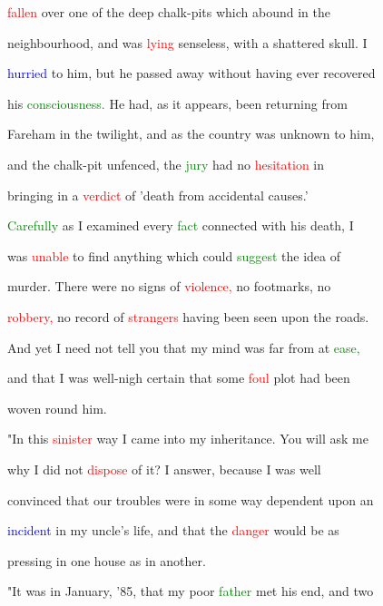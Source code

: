  \textcolor{red}{fallen} over one of the deep chalk-pits which abound in the

 neighbourhood, and was \textcolor{red}{lying} \textcolor{BurntOrange}{senseless,} with a \textcolor{BurntOrange}{shattered} skull. I

 \textcolor{blue}{hurried} to him, but he passed away without having ever recovered

 his \textcolor{green}{consciousness.} He had, as it appears, been returning from

 Fareham in the twilight, and as the country was \textcolor{BurntOrange}{unknown} to him,

 and the chalk-pit unfenced, the \textcolor{green}{jury} had no \textcolor{red}{hesitation} in

 bringing in a \textcolor{red}{verdict} of \textcolor{BurntOrange}{'death} from \textcolor{BurntOrange}{accidental} causes.'

 \textcolor{green}{Carefully} as I examined every \textcolor{green}{fact} connected with his \textcolor{BurntOrange}{death,} I

 was \textcolor{red}{unable} to find anything which could \textcolor{green}{suggest} the idea of

 \textcolor{BurntOrange}{murder.} There were no signs of \textcolor{red}{violence,} no footmarks, no

 \textcolor{red}{robbery,} no record of \textcolor{red}{strangers} having been seen upon the roads.

 And yet I need not tell you that my mind was far from at \textcolor{green}{ease,}

 and that I was well-nigh certain that some \textcolor{red}{foul} plot had been

 woven round him.



 "In this \textcolor{red}{sinister} way I came into my \textcolor{BurntOrange}{inheritance.} You will ask me

 why I did not \textcolor{red}{dispose} of it? I answer, because I was well

 \textcolor{BurntOrange}{convinced} that our troubles were in some way \textcolor{BurntOrange}{dependent} upon an

 \textcolor{blue}{incident} in my uncle's life, and that the \textcolor{red}{danger} would be as

 pressing in one house as in another.



 "It was in January, '85, that my poor \textcolor{green}{father} met his end, and two

